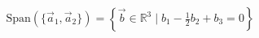 \documentclass[preview]{standalone}
\begin{document}
\begin{align*}
\text{Span}(\{\vec{a}_1, \vec{a}_2\}) = \left\{\vec{b} \in \mathbb{R}^3 \mid b_1 - \frac{1}{2}b_2 + b_3 = 0 \right\}
\end{align*}
\end{document}
